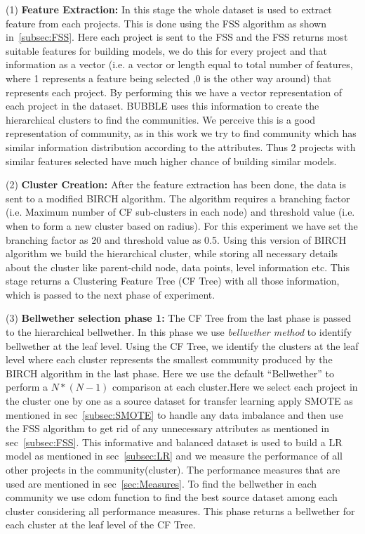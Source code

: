 \documentclass[10pt,journal,compsoc]{IEEEtran}
\begin{document}
    (1) \textbf{Feature Extraction:} In this stage the whole dataset is used to extract feature from each projects. This is done using the FSS algorithm as shown in~\ref{subsec:FSS}. Here each project is sent to the FSS and the FSS returns most suitable features for building models, we do this for every project and that information as a vector (i.e. a vector or length equal to total number of features, where 1 represents a feature being selected ,0 is the other way around) that represents each project. By performing this we have a vector representation of each project in the dataset. BUBBLE uses this information to create the hierarchical clusters to find the communities. We perceive this is a good representation of community, as in this work we try to find community which has similar information distribution according to the attributes. Thus 2 projects with similar features selected have much higher chance of building similar models.
    
    (2) \textbf{Cluster Creation:} After the feature extraction has been done, the data is sent to a modified BIRCH algorithm. The algorithm requires a branching factor (i.e. Maximum number of CF sub-clusters in each node) and threshold value (i.e. when to form a new cluster based on radius). For this experiment we have set the branching factor as 20 and threshold value as 0.5. Using this version of BIRCH algorithm we build the hierarchical cluster, while storing all necessary details about the cluster like parent-child node, data points, level information etc. This stage returns a Clustering Feature Tree (CF Tree) with all those information, which is passed to the next phase of experiment. 
    
    (3) \textbf{Bellwether selection phase 1:} The CF Tree from the last phase is passed to the hierarchical bellwether. In this phase we use \textit{bellwether method} to identify bellwether at the leaf level. Using the CF Tree, we identify the clusters at the leaf level where each cluster represents the smallest community produced by the BIRCH algorithm in the last phase. Here we use the default ``Bellwether'' to perform a $ N*(N-1) $ comparison at each cluster.Here we select each project in the cluster one by one as a source dataset for transfer learning apply SMOTE as mentioned in sec~\ref{subsec:SMOTE} to handle any data imbalance and then use the FSS algorithm to get rid of any unnecessary attributes as mentioned in sec~\ref{subsec:FSS}. This informative and balanced dataset is used to build a LR model as mentioned in sec~\ref{subsec:LR} and we measure the performance of all other projects in the community(cluster). The performance measures that are used are mentioned in sec~\ref{sec:Measures}. To find the bellwether in each community we use cdom function to find the best source dataset among each cluster considering all performance measures. This phase returns a bellwether for each cluster at the leaf level of the CF Tree.
    
\end{document}

